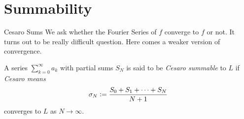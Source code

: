 \documentclass{beamer}
\begin{document}
\section{Summability}


\begin{frame}{Cesaro Sums}
    We ask whether the Fourier Series of $f$ converge to $f$ or not. It turns out to be really difficult question. Here comes a weaker version of convergence.
    \begin{definition}
        A series $\sum_{k=0}^{\infty} a_k$ with partial sums $S_N$ is said to be \textit{Cesaro summable} to $L$ if \textit{Cesaro means}
    \[
    \sigma_N \vcentcolon =  \frac{S_0 + S_1 + \dots + S_N }{N+1}
    \]
    converges to $L$ as $N \longrightarrow \infty$.
    \end{definition}


\end{frame}
\begin{comment}
    \begin{frame}{Two Kernels}
    \small
    In general, we will not deal with the original definitions but the equivalent versions of them. Two kernels defined here will make theorems a lot easier to prove.
    \begin{definition}[Kernels]
        Let $N$ be a nonnegative integer.
\begin{enumerate}
  \item[(i)] The Dirichlet kernel of order $N$ is the function defined, for each $x \in \mathbb{R}$, by
  \[
  D_N(x) = \begin{cases}
            \frac{1}{2} & \text{if } N = 0, \\
            \frac{1}{2}  + \sum_{k=1}^{N} \cos(kx) & \text{if } N \in \mathbb{N}.
           \end{cases}
  \]

  \item[(ii)] The Fejer kernel of order $N$ is the function defined, for each $x \in \mathbb{R}$, by
  \[
  K_N(x) = \begin{cases}
            \frac{1}{2} & \text{if } N = 0, \\
            \frac{1}{2} + \sum_{k=1}^{N}\left( 1 - \frac{k}{N + 1} \right)\cos(kx) & \text{if } N \in \mathbb{N}.
           \end{cases}
  \]
\end{enumerate}
    \end{definition}

\end{frame}
\end{comment}
\end{document}
